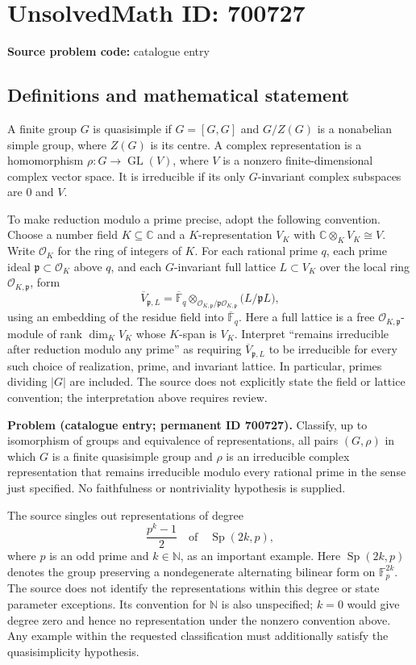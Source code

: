 \documentclass[11pt]{article}
\newcommand{\N}{\mathbb{N}}
\newcommand{\C}{\mathbb{C}}
\newcommand{\F}{\mathbb{F}}
\begin{document}
\section*{UnsolvedMath ID: 700727}
\textbf{Source problem code:} catalogue entry
\subsection{Definitions and mathematical statement}
A finite group \(G\) is quasisimple if \(G=[G,G]\) and \(G/Z(G)\) is a nonabelian simple group, where \(Z(G)\) is its centre. A complex representation is a homomorphism \(\rho:G\to\operatorname{GL}(V)\), where \(V\) is a nonzero finite-dimensional complex vector space. It is irreducible if its only \(G\)-invariant complex subspaces are \(0\) and \(V\).

To make reduction modulo a prime precise, adopt the following convention. Choose a number field \(K\subseteq\C\) and a \(K\)-representation \(V_K\) with \(\C\otimes_K V_K\cong V\). Write \(\mathcal O_K\) for the ring of integers of \(K\). For each rational prime \(q\), each prime ideal \(\mathfrak p\subset\mathcal O_K\) above \(q\), and each \(G\)-invariant full lattice \(L\subset V_K\) over the local ring \(\mathcal O_{K,\mathfrak p}\), form
\[
\overline V_{\mathfrak p,L}
=\overline{\F}_q\otimes_{\mathcal O_{K,\mathfrak p}/\mathfrak p\mathcal O_{K,\mathfrak p}}
\bigl(L/\mathfrak p L\bigr),
\]
using an embedding of the residue field into \(\overline{\F}_q\). Here a full lattice is a free \(\mathcal O_{K,\mathfrak p}\)-module of rank \(\dim_K V_K\) whose \(K\)-span is \(V_K\). Interpret ``remains irreducible after reduction modulo any prime'' as requiring \(\overline V_{\mathfrak p,L}\) to be irreducible for every such choice of realization, prime, and invariant lattice. In particular, primes dividing \(|G|\) are included. The source does not explicitly state the field or lattice convention; the interpretation above requires review.

\textbf{Problem (catalogue entry; permanent ID 700727).} Classify, up to isomorphism of groups and equivalence of representations, all pairs \((G,\rho)\) in which \(G\) is a finite quasisimple group and \(\rho\) is an irreducible complex representation that remains irreducible modulo every rational prime in the sense just specified. No faithfulness or nontriviality hypothesis is supplied.

The source singles out representations of degree
\[
\frac{p^k-1}{2}
\quad\text{of}\quad \operatorname{Sp}(2k,p),
\]
where \(p\) is an odd prime and \(k\in\N\), as an important example. Here \(\operatorname{Sp}(2k,p)\) denotes the group preserving a nondegenerate alternating bilinear form on \(\F_p^{2k}\). The source does not identify the representations within this degree or state parameter exceptions. Its convention for \(\N\) is also unspecified; \(k=0\) would give degree zero and hence no representation under the nonzero convention above. Any example within the requested classification must additionally satisfy the quasisimplicity hypothesis.
\end{document}
